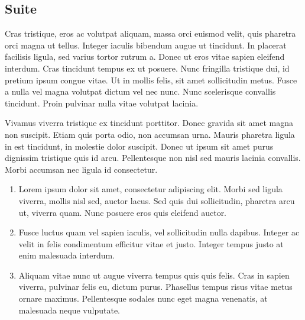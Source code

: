         \subsection{Suite}

        Cras tristique, eros ac volutpat aliquam, massa orci euismod velit,
        quis pharetra orci magna ut tellus. Integer iaculis bibendum augue ut
        tincidunt. In placerat facilisis ligula, sed varius tortor rutrum a.
        Donec ut eros vitae sapien eleifend interdum. Cras tincidunt tempus ex
        ut posuere. Nunc fringilla tristique dui, id pretium ipsum congue
        vitae. Ut in mollis felis, sit amet sollicitudin metus. Fusce a nulla
        vel magna volutpat dictum vel nec nunc. Nunc scelerisque convallis
        tincidunt. Proin pulvinar nulla vitae volutpat lacinia.

        Vivamus viverra tristique ex tincidunt porttitor. Donec gravida sit amet magna
        non suscipit. Etiam quis porta odio, non accumsan urna. Mauris pharetra ligula
        in est tincidunt, in molestie dolor suscipit. Donec ut ipsum sit amet purus
        dignissim tristique quis id arcu. Pellentesque non nisl sed mauris
        lacinia convallis. Morbi accumsan nec ligula id consectetur.

        \begin{enumerate}
            \item Lorem ipsum dolor sit amet, consectetur adipiscing elit.
                Morbi sed ligula viverra, mollis nisl sed, auctor lacus.
                Sed quis dui sollicitudin, pharetra arcu ut, viverra quam.
                Nunc posuere eros quis eleifend auctor.

            \item Fusce luctus quam vel sapien iaculis, vel sollicitudin nulla
                dapibus. Integer ac velit in felis condimentum efficitur vitae
                et justo. Integer tempus justo at enim malesuada interdum.

            \item Aliquam vitae nunc ut augue viverra tempus quis quis felis.
                Cras in sapien viverra, pulvinar felis eu, dictum purus.
                Phasellus tempus risus vitae metus ornare maximus. Pellentesque
                sodales nunc eget magna venenatis, at malesuada neque
                vulputate.
        \end{enumerate}

\newpage


